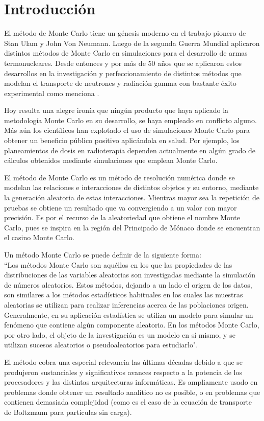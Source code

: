 \documentclass{rbf}
\begin{document}
\section{Introducción}
El método de Monte Carlo tiene un génesis moderno en el trabajo pionero de Stan Ulam y John Von Neumann. Luego de la segunda Guerra Mundial aplicaron distintos métodos de Monte Carlo en simulaciones para el desarrollo de armas termonucleares. Desde entonces y por más de 50 años que se aplicaron estos desarrollos en la investigación y perfeccionamiento de distintos métodos que modelan el transporte de neutrones y radiación gamma con bastante éxito experimental como menciona \cite{biela}. 

Hoy resulta una alegre ironía que ningún producto que haya aplicado la metodología Monte Carlo en su desarrollo, se haya empleado en conflicto alguno. Más aún los científicos han explotado el uso de simulaciones Monte Carlo para obtener un beneficio público positivo aplicándola en salud. Por ejemplo, los planeamientos de dosis en radioterapia dependen actualmente en algún grado de cálculos obtenidos mediante simulaciones que emplean Monte Carlo.

El método de Monte Carlo es un método de resolución numérica donde se modelan las relaciones e interacciones de distintos objetos y su entorno, mediante la generación aleatoria de estas interacciones. Mientras mayor sea la repetición de pruebas se obtiene un resultado que va convergiendo a un valor con mayor precisión. Es por el recurso de la aleatoriedad que obtiene el nombre Monte Carlo, pues se inspira en la región del Principado de Mónaco donde se encuentran el casino Monte Carlo.

Un método Monte Carlo se puede definir de la siguiente forma: \\
``Los métodos Monte Carlo son aquéllos en los que las propiedades de las distribuciones de las variables aleatorias son investigadas mediante la simulación de números aleatorios. Estos métodos, dejando a un lado el origen de los datos, son similares a los métodos estadísticos habituales en los cuales las muestras aleatorias se utilizan para realizar inferencias acerca de las poblaciones origen. Generalmente, en su aplicación estadística se utiliza un modelo para simular un fenómeno que contiene algún componente aleatorio. En los métodos Monte Carlo, por otro lado, el objeto de la investigación es un modelo en sí mismo, y se utilizan sucesos aleatorios o pseudoaleatorios para estudiarlo".\cite{gent}

El método cobra una especial relevancia las últimas décadas debido a que se produjeron sustanciales y significativos avances respecto a la potencia de los procesadores y las distintas arquitecturas informáticas. Es ampliamente usado en problemas donde obtener un resultado analítico no es posible, o en problemas que contienen demasiada complejidad (como es el caso de la ecuación de transporte de Boltzmann para partículas sin carga).\cite{biela}
\end{document}
